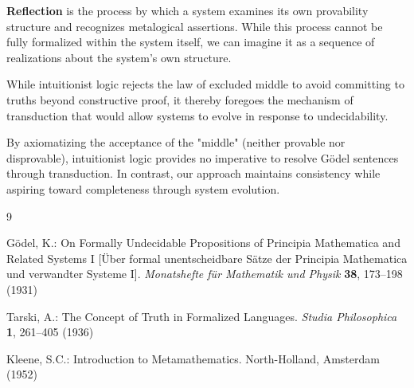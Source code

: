 \documentclass[runningheads]{llncs}
\begin{document}
\medskip

\begin{definition}[Reflection]
\textbf{Reflection} is the process by which a system examines its own provability structure and recognizes metalogical assertions. While this process cannot be fully formalized within the system itself, we can imagine it as a sequence of realizations about the system's own structure.
\end{definition}

\medskip

\begin{remark}
While intuitionist logic rejects the law of excluded middle to avoid committing to truths beyond constructive proof, it thereby foregoes the mechanism of transduction that would allow systems to evolve in response to undecidability.

By axiomatizing the acceptance of the "middle" (neither provable nor disprovable), intuitionist logic provides no imperative to resolve Gödel sentences through transduction. In contrast, our approach maintains consistency while aspiring toward completeness through system evolution.
\end{remark}

\medskip

\begin{thebibliography}{9}
    
    Gödel, K.: On Formally Undecidable Propositions of Principia Mathematica and Related Systems I [Über formal unentscheidbare Sätze der Principia Mathematica und verwandter Systeme I]. \textit{Monatshefte für Mathematik und Physik} \textbf{38}, 173--198 (1931)
    
    Tarski, A.: The Concept of Truth in Formalized Languages. \textit{Studia Philosophica} \textbf{1}, 261--405 (1936)
    
    Kleene, S.C.: Introduction to Metamathematics. North-Holland, Amsterdam (1952)
    
\end{thebibliography}
\end{document}
